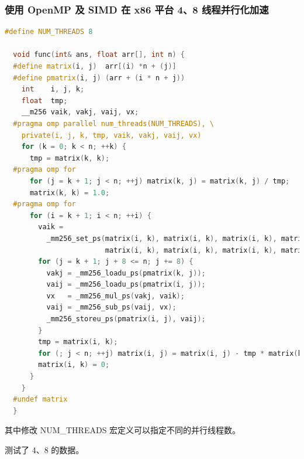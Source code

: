 \documentclass[a4paper]{article}
\begin{document}
\subsubsection{使用 OpenMP 及 SIMD 在 x86 平台 4、8 线程并行化加速}

\begin{lstlisting}[title=x86 OpenMP + AVX 并行化加速,frame=trbl,language={C++}]
  #define NUM_THREADS 8

  void func(int& ans, float arr[], int n) {
  #define matrix(i, j)  arr[(i) *n + (j)]
  #define pmatrix(i, j) (arr + (i * n + j))
    int    i, j, k;
    float  tmp;
    __m256 vaik, vakj, vaij, vx;
  #pragma omp parallel num_threads(NUM_THREADS), \
    private(i, j, k, tmp, vaik, vakj, vaij, vx)
    for (k = 0; k < n; ++k) {
      tmp = matrix(k, k);
  #pragma omp for
      for (j = k + 1; j < n; ++j) matrix(k, j) = matrix(k, j) / tmp;
      matrix(k, k) = 1.0;
  #pragma omp for
      for (i = k + 1; i < n; ++i) {
        vaik =
          _mm256_set_ps(matrix(i, k), matrix(i, k), matrix(i, k), matrix(i, k),
                        matrix(i, k), matrix(i, k), matrix(i, k), matrix(i, k));
        for (j = k + 1; j + 8 <= n; j += 8) {
          vakj = _mm256_loadu_ps(pmatrix(k, j));
          vaij = _mm256_loadu_ps(pmatrix(i, j));
          vx   = _mm256_mul_ps(vakj, vaik);
          vaij = _mm256_sub_ps(vaij, vx);
          _mm256_storeu_ps(pmatrix(i, j), vaij);
        }
        tmp = matrix(i, k);
        for (; j < n; ++j) matrix(i, j) = matrix(i, j) - tmp * matrix(k, j);
        matrix(i, k) = 0;
      }
    }
  #undef matrix
  }
\end{lstlisting}

其中修改 NUM\_THREADS 宏定义可以指定不同的并行线程数。

测试了 4、8 的数据。
\end{document}
